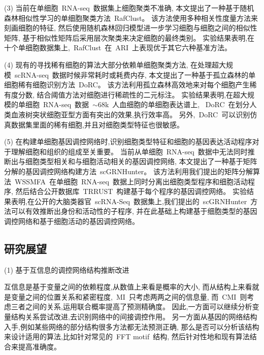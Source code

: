 (3) 当前在单细胞~RNA-seq~数据集上细胞聚类不准确,
本文提出了一种基于随机森林相似性学习的单细胞聚类方法~RafClust。
该方法使用多种相关性度量方法来刻画细胞的特征, 
然后使用随机森林回归模型进一步学习细胞与细胞之间的相似性矩阵,
基于相似性矩阵后采用层次聚类来决定细胞的最终类别。
实验结果表明,在十个单细胞数据集上,~RafClust~在~ARI~上表现优于其它六种基准方法。

(4) 现有的寻找稀有细胞的算法大部分依赖单细胞聚类方法,
在处理超大规模~scRNA-seq~数据时候非常耗时或耗费内存,
本文提出了一种基于孤立森林的单细胞稀有细胞识别方法~DoRC。
该方法利用孤立森林高效地来对每个细胞产生稀有度分数,
结合阈值方法对细胞进行稀疏性的二元标注。
实验结果表明,在超大规模的单细胞~RNA-seq~数据~${\sim}68$k~人血细胞的单细胞表达谱上,
~DoRC~在划分人类血液树突状细胞亚型方面有突出的效果,执行效率高。
另外,~DoRC~可以识别仿真数据集里面的稀有细胞,并且对细胞类型特征也很敏感。


(5) 在构建单细胞基因调控网络时,识别细胞类型特征和细胞的基因表达活动程序对于理解细胞和组织的组成至关重要。
当前从单细胞~RNA-seq~数据中无法同时推断出与细胞类型相关和与细胞活动相关的基因调控网络,
本文提出了一种基于矩阵分解的基因调控网络构建方法~scGRNHunter。
该方法利用我们提出的矩阵分解算法~WSSMFA~在单细胞~RNA-seq~数据上同时分离出细胞类型程序和细胞活动程序,
然后结合公开数据库~TRRUST~构建基于每个程序的基因调控网络。
实验结果表明,在公开的大脑类器官~scRNA-Seq~数据集上,我们提出的~scGRNHunter~方法可以有效推断出身份和活动性的子程序, 
并在此基础上构建基于细胞类型的基因调控网络和基于细胞活动的基因调控网络。


\subsection{研究展望}

(1) 基于互信息的调控网络结构推断改进

互信息是基于变量之间的依赖程度,从数值上来看是概率的大小,
而从结构上来看就是变量之间的位置关系和紧密程度,~MI~只考虑两两之间的信息量,
而~CMI~则考虑三者之间的关系,运用联合概率提高了预测精确度。
因此,一方面可以继续分析变量结构关系尝试改进,去识别网络中的间接调控作用。
另一方面从基因的网络结构入手,例如某些网络的部分结构很多方法都无法预测正确,
那么是否可以分析该结构来设计适用的算法,比如针对常见的~FFT motif~结构, 
然后针对性地和现有算法结合来提高准确度。

